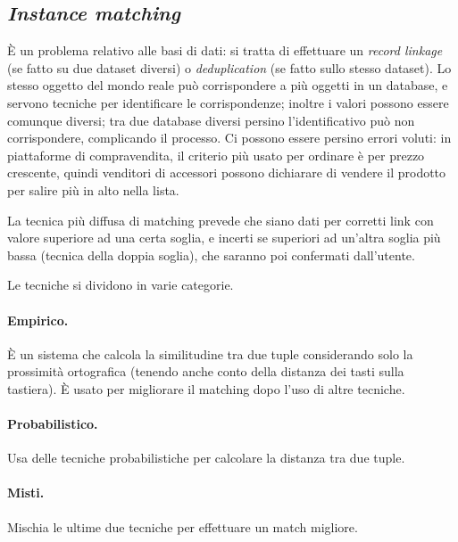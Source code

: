 \documentclass[11pt]{article}
\begin{document}
\subsection{\textit{Instance matching}}
È un problema relativo alle basi di dati: si tratta di effettuare un \textit{record linkage} (se fatto su due dataset diversi) o \textit{deduplication} (se fatto sullo stesso dataset).
Lo stesso oggetto del mondo reale può corrispondere a più oggetti in un database, e servono tecniche per identificare le corrispondenze; inoltre i valori possono essere comunque diversi; tra due database diversi persino l'identificativo può non corrispondere, complicando il processo.
Ci possono essere persino errori voluti: in piattaforme di compravendita, il criterio più usato per ordinare è per prezzo crescente, quindi venditori di accessori possono dichiarare di vendere il prodotto per salire più in alto nella lista.

La tecnica più diffusa di matching prevede che siano dati per corretti link con valore superiore ad una certa soglia, e incerti se superiori ad un'altra soglia più bassa (tecnica della doppia soglia), che saranno poi confermati dall'utente.

Le tecniche si dividono in varie categorie.

\paragraph{Empirico.}
È un sistema che calcola la similitudine tra due tuple considerando solo la prossimità ortografica (tenendo anche conto della distanza dei tasti sulla tastiera).
È usato per migliorare il matching dopo l'uso di altre tecniche.

\paragraph{Probabilistico.}
Usa delle tecniche probabilistiche per calcolare la distanza tra due tuple.


\paragraph{Misti.}
Mischia le ultime due tecniche per effettuare un match migliore.
\newline
\end{document}
